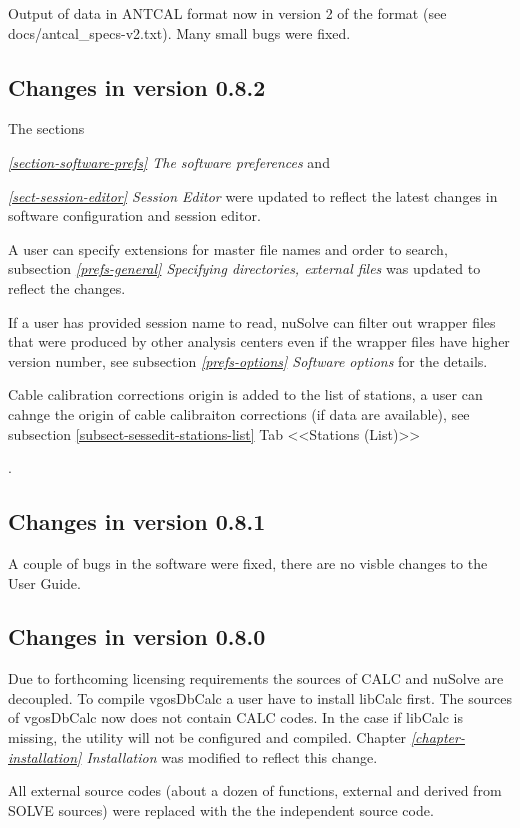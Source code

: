\documentclass [10pt,letterpaper]{report}
\begin{document}
Output of data in ANTCAL format now in version 2 of the format (see
docs/antcal\_specs-v2.txt). Many small bugs were fixed.


\subsection{Changes in version 0.8.2}

The sections {\emph{\ref{section-software-prefs} The software preferences}
and {\emph{\ref{sect-session-editor} Session Editor} were updated to reflect
the latest changes in software configuration and session editor.

A user can specify extensions for master file names and order to search, subsection
\emph{\ref{prefs-general} Specifying directories, external files}
was updated to reflect the changes.

If a user has provided session name to read, nuSolve can filter out wrapper files
that were produced by other analysis centers even if the wrapper files have higher
version number, see subsection
\emph{\ref{prefs-options} Software options}
for the details.

Cable calibration corrections origin is added to the list of stations, a user
can cahnge the origin of cable calibraiton corrections (if data are available), see
subsection
\ref{subsect-sessedit-stations-list} Tab <<Stations (List)>>}.



\subsection{Changes in version 0.8.1}
A couple of bugs in the software were fixed, there are no visble changes to
the User Guide.


\subsection{Changes in version 0.8.0}
Due to forthcoming licensing requirements the sources of CALC and nuSolve are
decoupled. To compile vgosDbCalc a user have to install libCalc first. The sources
of vgosDbCalc now does not contain CALC codes. In the case if libCalc is missing,
the utility will not be configured and compiled.
Chapter \emph{\ref{chapter-installation} Installation} was modified to reflect this
change.

All external source codes (about a dozen of functions, external and derived
from SOLVE sources) were replaced with the the independent source code.

}
\end{document}
